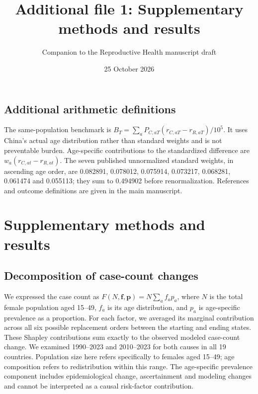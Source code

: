 \documentclass[11pt,a4paper]{article}
\title{Additional file 1: Supplementary methods and results}
\author{Companion to the Reproductive Health manuscript draft}
\date{25 October 2026}
\begin{document}
\maketitle
\subsection*{Additional arithmetic definitions}
The same-population benchmark is $B_T=\sum_a P_{C,aT}(r_{C,aT}-r_{R,aT})/10^5$. It uses China's actual age distribution rather than standard weights and is not preventable burden. Age-specific contributions to the standardized difference are $w_a(r_{C,at}-r_{R,at})$. The seven published unnormalized standard weights, in ascending age order, are 0.082891, 0.078012, 0.075914, 0.073217, 0.068281, 0.061474 and 0.055113; they sum to 0.494902 before renormalization. References and outcome definitions are given in the main manuscript.
\section{Supplementary methods and results}
\renewcommand{\thetable}{S\arabic{table}}\setcounter{table}{0}
\renewcommand{\thefigure}{S\arabic{figure}}\setcounter{figure}{0}
\subsection{Decomposition of case-count changes}
We expressed the case count as $F(N,\boldsymbol f,\boldsymbol p)=N\sum_a f_a p_a$, where $N$ is the total female population aged 15--49, $f_a$ is its age distribution, and $p_a$ is age-specific prevalence as a proportion. For each factor, we averaged its marginal contribution across all six possible replacement orders between the starting and ending states. These Shapley contributions sum exactly to the observed modeled case-count change. We examined 1990--2023 and 2010--2023 for both causes in all 19 countries. Population size here refers specifically to females aged 15--49; age composition refers to redistribution within this range. The age-specific prevalence component includes epidemiological change, ascertainment and modeling changes and cannot be interpreted as a causal risk-factor contribution.
\end{document}
